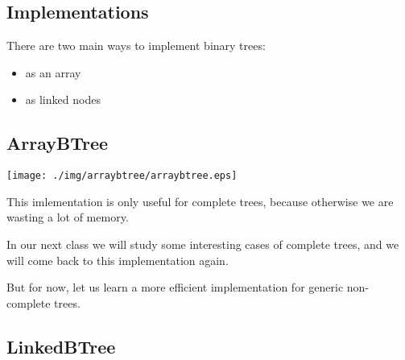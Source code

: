 \documentclass[a4paper, 9pt]{extarticle}
\begin{document}
\newpage



\subsection{Implementations}

There are two main ways to implement binary trees:

\begin{itemize}

  \item as an array

  \item as linked nodes

\end{itemize}

\subsection{ArrayBTree}

\begin{center}
  \texttt{[image: ./img/arraybtree/arraybtree.eps]}
\end{center}

This imlementation is only useful for complete trees,
because otherwise we are wasting a lot of memory.

In our next class we will study some interesting cases of complete trees,
and we will come back to this implementation again.

But for now, let us learn a more efficient implementation for generic non-complete trees.


\subsection{LinkedBTree}
\end{document}
